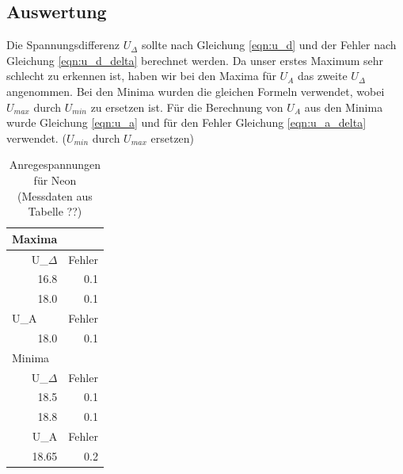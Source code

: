 \documentclass[12pt,a4paper]{article}
\begin{document}
\subsection{Auswertung}
Die Spannungsdifferenz $U_\Delta$ sollte nach Gleichung \ref{eqn:u_d} und der Fehler nach Gleichung \ref{eqn:u_d_delta} berechnet werden.
Da unser erstes Maximum sehr schlecht zu erkennen ist, haben wir bei den Maxima für $U_A$ das zweite $U_\Delta$ angenommen.
Bei den Minima wurden die gleichen Formeln verwendet, wobei $U_{max}$ durch $U_{min}$ zu ersetzen ist. Für die Berechnung von $U_A$ aus den Minima wurde Gleichung \ref{eqn:u_a} und für den Fehler Gleichung \ref{eqn:u_a_delta} verwendet. ($U_{min}$ durch $U_{max}$ ersetzen)
\begin{table}[H]
\caption{Anregespannungen für Neon (Messdaten aus Tabelle ??)}
\begin{center}
\begin{tabular}{|r|r|}
\hline
\multicolumn{1}{|l|}{Maxima} & \multicolumn{1}{l|}{} \\ \hline
U\_$\Delta$ & Fehler \\ \hline
16.8 & 0.1 \\ \hline
18.0 & 0.1 \\ \hline
\multicolumn{1}{|l|}{U\_A} & \multicolumn{1}{l|}{Fehler} \\ \hline
18.0 & 0.1 \\ \hline
\multicolumn{1}{|l|}{Minima} & \multicolumn{1}{l|}{} \\ \hline
U\_$\Delta$ & Fehler \\ \hline
18.5 & 0.1 \\ \hline
18.8 & 0.1 \\ \hline
U\_A & Fehler \\ \hline
18.65 & 0.2 \\ \hline
\end{tabular}
\end{center}
\label{tab: auswertung_n}
\end{table}
\end{document}
